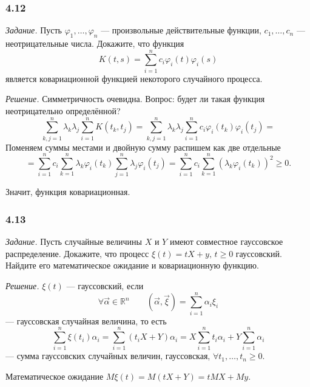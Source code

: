 \subsubsection*{4.12}

\textit{Задание.}
Пусть $ \varphi_1, \dotsc, \varphi_n$ --- произвольные действительные функции,
$c_1, \dotsc, c_n$ --- неотрицательные числа.
Докажите, что функция
$$K \left( t, s \right) =
  \sum \limits_{i = 1}^n c_i \varphi_i \left( t \right) \varphi_i \left( s \right) $$
является ковариационной функцией некоторого случайного процесса.

\textit{Решение.}
Симметричность очевидна.
Вопрос: будет ли такая функция неотрицательно определённой?
$$ \sum \limits_{k, j = 1}^n \lambda_k \lambda_j \sum \limits_{i = 1}^n K \left( t_k, t_j \right) =
  \sum \limits_{k, j = 1}^n \lambda_k \lambda_j
  \sum \limits_{i = 1}^n c_i \varphi_i \left( t_k \right) \varphi_i \left( t_j \right) =$$
Поменяем суммы местами и двойную сумму распишем как две отдельные
$$= \sum \limits_{i = 1}^n c_i \sum \limits_{k = 1}^n \lambda_k \varphi_i \left( t_k \right)
  \sum \limits_{j = 1}^n \lambda_j \varphi_i \left( t_j \right) =
  \sum \limits_{i = 1}^n c_i
    \sum \limits_{k = 1}^n \left( \lambda_k \varphi_i \left( t_k \right) \right)^2 \geq
  0.$$

Значит, функция ковариационная.


\subsubsection*{4.13}

\textit{Задание.}
Пусть случайные величины $X$ и $Y$ имеют совместное гауссовское распределение.
Докажите, что процесс $ \xi \left( t \right) = tX + y, \, t \geq 0$ гауссовский.
Найдите его математическое ожидание и ковариационную функцию.

\textit{Решение.}
$ \xi \left( t \right) $ --- гауссовский, если
$$ \forall \vec{ \alpha } \in \mathbb{R}^n \qquad
  \left( \vec{ \alpha }, \vec{ \xi } \right) = \sum \limits_{i = 1}^n \alpha_i \xi_i$$
--- гауссовская случайная величина, то есть
$$ \sum \limits_{i = 1}^n \xi \left( t_i \right) \alpha_i =
  \sum \limits_{i = 1}^n \left( t_i X + Y \right) \alpha_i =
  X \sum \limits_{i = 1}^n t_i \alpha_i + Y \sum \limits_{i = 1}^n \alpha_i$$
--- сумма гауссовских случайных величин, гауссовская, $ \forall t_1, \dotsc, t_n \geq 0$.

Математическое ожидание $M \xi \left( t \right) = M \left( tX + Y \right) = tMX + My$.

